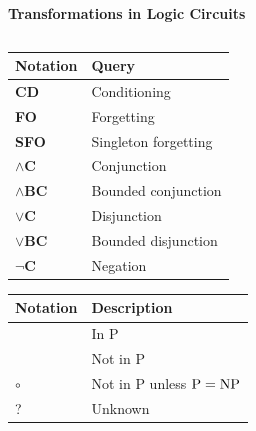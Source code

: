 \documentclass[aspectratio=169]{beamer}
\newcommand{\cmark}{\color{rightgreen}\ding{51}}%
\newcommand{\xmark}{\color{wrongred}\ding{55}}%
\newcommand{\omark}{{\color{dark gray}\tiny$\bm{\circ}$}}%
\begin{document}
\begin{frame}[fragile]{\textbf{Transformations in Logic Circuits}}
\begin{center}
\begin{minipage}{0.65\textwidth}
\begin{tabular}{l|cccccccc}
    \end{tabular}
  \end{minipage}%
  \begin{minipage}{0.35\textwidth}
    \begin{tabular}{l|l}
      \textbf{Notation} & \textbf{Query}\\
      \hline
      \textbf{CD} & Conditioning\\
      \textbf{FO} & Forgetting\\
      \textbf{SFO} & Singleton forgetting\\
      \textbf{$\wedge$C} & Conjunction\\
      \textbf{$\wedge$BC} & Bounded conjunction\\
      \textbf{$\vee$C} & Disjunction\\
      \textbf{$\vee$BC} & Bounded disjunction\\
      \textbf{$\neg$C} & Negation\\
    \end{tabular}

    \vspace{0.5cm}

    \begin{tabular}{l|l}
      \textbf{Notation} & \textbf{Description}\\
      \hline
      \cmark & In P\\
      \xmark & Not in P\\
      \omark & Not in P unless $\textup{P}=\textup{NP}$\\
      ? & Unknown\\
    \end{tabular}
  \end{minipage}
\end{center}

\vfill
\textcolor{dark gray}{\scriptsize\citep{darwiche02}}

\end{frame}




\def\isfinalversion{1}
\ifx\isfinalversion\undefined
  \newcommand{\nsamples}{10}
\else
  \newcommand{\nsamples}{50}
\fi
\newenvironment{vhcenterb}{\vspace*{\fill}\begin{center}}{\end{center}\vspace*{\fill}}
\end{document}
